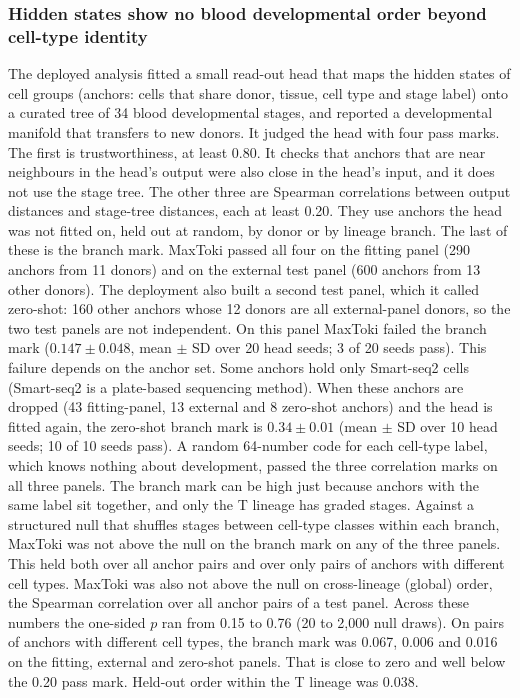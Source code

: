 \documentclass[10pt,letterpaper]{article}
\begin{document}
\subsubsection*{Hidden states show no blood developmental order beyond cell-type identity}
The deployed analysis fitted a small read-out head that maps the hidden
states of cell groups (anchors: cells that share donor, tissue, cell type
and stage label) onto a curated tree of 34 blood developmental stages,
and reported a developmental manifold that transfers to new donors. It
judged the head with four pass marks. The first is trustworthiness, at
least 0.80. It checks that anchors that are near neighbours in the
head's output were also close in the head's input, and it does not use
the stage tree. The other three are Spearman correlations between
output distances and stage-tree distances, each at least 0.20. They use
anchors the head was not fitted on, held out at random, by donor or by
lineage branch. The last of these is the branch mark. MaxToki passed
all four on the fitting panel (290 anchors from 11
donors) and on the external test panel (600 anchors from 13 other
donors). The deployment also built a second test panel, which it called
zero-shot: 160 other anchors whose 12 donors are all external-panel
donors, so the two test panels are not independent. On this panel
MaxToki failed the branch mark ($0.147 \pm 0.048$, mean $\pm$ SD over 20
head seeds; 3 of 20 seeds pass). This failure depends on the anchor
set. Some anchors hold only Smart-seq2 cells (Smart-seq2 is a
plate-based sequencing method). When these anchors are dropped (43
fitting-panel, 13 external and 8 zero-shot anchors) and the head is
fitted again, the zero-shot branch mark is $0.34 \pm 0.01$ (mean $\pm$
SD over 10 head seeds; 10 of 10 seeds pass). A random 64-number code for
each cell-type label, which knows nothing about development, passed the three
correlation marks on all three panels. The branch mark can be high just
because anchors with the same label sit together, and only the T lineage
has graded stages. Against a structured null that shuffles stages
between cell-type classes within each branch, MaxToki was not above
the null on the branch mark on any of the three panels. This held both
over all anchor pairs and over only pairs of anchors with different
cell types. MaxToki was also not above the null on cross-lineage
(global) order, the Spearman correlation over all anchor pairs of a test
panel. Across these numbers the one-sided $p$ ran from 0.15 to 0.76 (20
to 2,000 null draws). On pairs of anchors with different cell types, the
branch mark was 0.067, 0.006 and 0.016 on the fitting, external and
zero-shot panels. That is close to zero and well below the
0.20 pass mark. Held-out order within the T lineage was 0.038.
\end{document}
